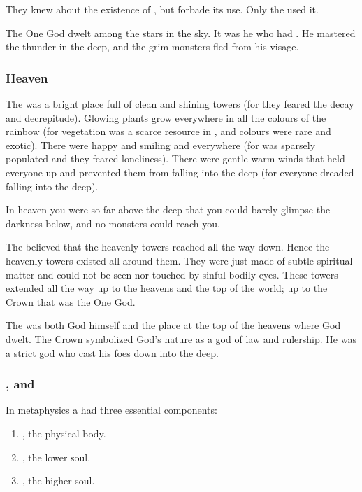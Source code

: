 They knew about the existence of \itzach, but forbade its use. 
Only the  used it. 

The One God dwelt among the stars in the sky. 
It was he who had . 
He mastered the thunder in the deep, and the grim monsters fled from his visage. 





\subsubsection{Heaven}
The \Merkyran {} was a bright place full of clean and shining towers (for they feared the decay and decrepitude). 
Glowing plants grow everywhere in all the colours of the rainbow (for vegetation was a scarce resource in \Nyx, and colours were rare and exotic). 
There were happy and smiling \resphain and \humans everywhere (for \Nyx was sparsely populated and they feared loneliness).
There were gentle warm winds that held everyone up and prevented them from falling into the deep (for everyone dreaded falling into the deep). 

In heaven you were so far above the deep that you could barely glimpse the darkness below, and no monsters could reach you.

The \Merkyrans believed that the heavenly towers reached all the way down.
Hence the heavenly towers existed all around them. 
They were just made of subtle spiritual matter and could not be seen nor touched by sinful bodily eyes. 
These towers extended all the way up to the heavens and the top of the world; up to the Crown that was the One God. 

The  was both God himself and the place at the top of the heavens where God dwelt. 
The Crown symbolized God's nature as a god of law and rulership.
He was a strict god who cast his foes down into the deep. 





\subsubsection{\Iod, \iai and \iath}
In \Merkyran metaphysics a \resphan had three essential components: 
\begin{enumerate}
  \item \Iod, the physical body. 
  \item \Iai, the lower soul.
  \item \Iath, the higher soul. 
\end{enumerate}

